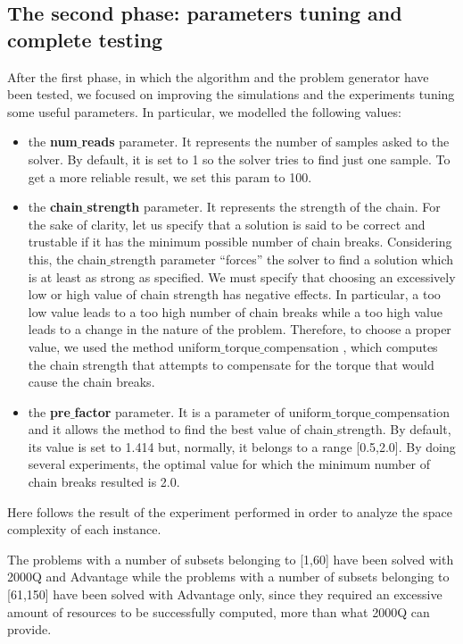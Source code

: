 \documentclass[oneside,a4paper]{article}
\begin{document}
\subsection{The second phase: parameters tuning and complete testing}
After the first phase, in which the algorithm and the problem generator have been tested, we focused on improving the simulations and the experiments tuning some useful parameters. In particular, we modelled the following values:
\begin{itemize}
    \item the \textbf{num$\_$reads} parameter. It represents the number of samples asked to the solver. By default, it is set to 1 so the solver tries to find just one sample. To get a more reliable result, we set this param to 100.
    \item the \textbf{chain$\_$strength} parameter. It represents the strength of the chain. For the sake of clarity, let us specify that a solution is said to be correct and trustable if it has the minimum possible number of chain breaks. Considering this, the chain$\_$strength parameter “forces” the solver to find a solution which is at least as strong as specified. We must specify that choosing an excessively low or high value of chain strength has negative effects. In particular, a too low value leads to a too high number of chain breaks while a too high value leads to a change in the nature of the problem\cite{WebSite4}. Therefore, to choose a proper value, we used the method uniform$\_$torque$\_$compensation \cite{WebSite5}, which computes the chain strength that attempts to compensate for the torque that would cause the chain breaks.
    \item the \textbf{pre$\_$factor} parameter. It is a parameter of uniform$\_$torque$\_$compensation and it allows the method to find the best value of chain$\_$strength. By default, its value is set to 1.414 but, normally, it belongs to a range [0.5,2.0]. By doing several experiments, the optimal value for which the minimum number of chain breaks resulted is 2.0.
\end{itemize}
Here follows the result of the experiment performed in order to analyze the space complexity of each instance.

The problems with a number of subsets belonging to [1,60] have been solved with 2000Q and Advantage while the problems with a number of subsets belonging to [61,150] have been solved with Advantage only, since they required an excessive amount of resources to be successfully computed, more than what 2000Q can provide.
\end{document}
